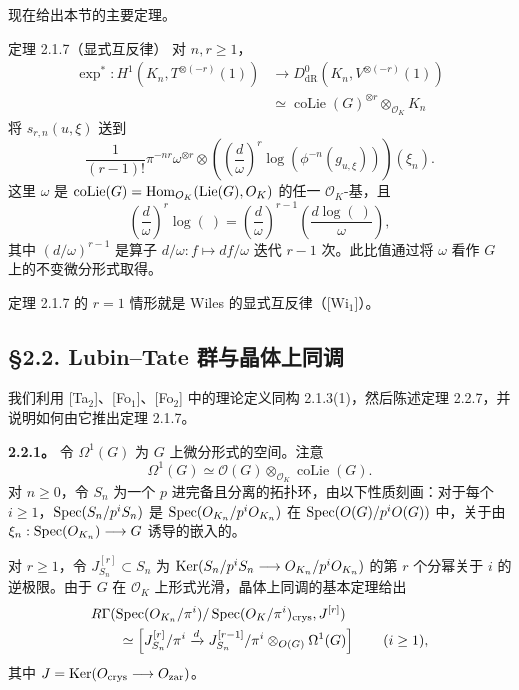 现在给出本节的主要定理。
\begin{statement}{定理 2.1.7（显式互反律）}
对 $n,r\ge1$，
\begin{align*}
 \exp^*:H^1(K_n,T^{\otimes(-r)}(1))
 &\longrightarrow D^0_{\mathrm{dR}}(K_n,V^{\otimes(-r)}(1))\\
 &\simeq\operatorname{coLie}(G)^{\otimes r}\otimes_{\mathcal O_K}K_n
\end{align*}
将 $s_{r,n}(u,\xi)$ 送到
\[
 \frac{1}{(r-1)!}\pi^{-nr}\omega^{\otimes r}\otimes
 \left(\left(\frac d\omega\right)^r\log(\phi^{-n}(g_{u,\xi}))\right)(\xi_n).
\]
这里 $\omega$ 是 $\operatorname{coLie}(G)=\operatorname{Hom}_{O_K}(\operatorname{Lie}(G),O_K)$ 的任一 $\mathcal O_K$-基，且
\[
 \left(\frac d\omega\right)^r\log(\ )=
 \left(\frac d\omega\right)^{r-1}\left(\frac{d\log(\ )}{\omega}\right),
\]
其中 $(d/\omega)^{r-1}$ 是算子 $d/\omega:f\mapsto df/\omega$ 迭代 $r-1$ 次。此比值通过将 $\omega$ 看作 $G$ 上的不变微分形式取得。
\end{statement}
定理 2.1.7 的 $r=1$ 情形就是 Wiles 的显式互反律（[Wi$_1$]）。

\subsection*{§2.2. Lubin--Tate 群与晶体上同调}
我们利用 [Ta$_2$]、[Fo$_1$]、[Fo$_2$] 中的理论定义同构 2.1.3(1)，然后陈述定理 2.2.7，并说明如何由它推出定理 2.1.7。

\textbf{2.2.1。} 令 $\Omega^1(G)$ 为 $G$ 上微分形式的空间。注意
\[
 \Omega^1(G)\simeq\mathcal O(G)\otimes_{\mathcal O_K}\operatorname{coLie}(G).
\]
对 $n\ge0$，令 $S_n$ 为一个 $p$ 进完备且分离的拓扑环，由以下性质刻画：对于每个 $i\ge1$，$\operatorname{Spec}(S_n/p^iS_n)$ 是
$\operatorname{Spec}(O_{K_n}/p^iO_{K_n})$ 在 $\operatorname{Spec}(O(G)/p^iO(G))$ 中，关于由 $\xi_n:\operatorname{Spec}(O_{K_n})\longrightarrow G$ 诱导的嵌入的。

对 $r\ge1$，令 $J^{[r]}_{S_n}\subset S_n$ 为 $\operatorname{Ker}(S_n/p^iS_n\longrightarrow O_{K_n}/p^iO_{K_n})$ 的第 $r$ 个分幂关于 $i$ 的逆极限。由于 $G$ 在 $\mathcal O_K$ 上形式光滑，晶体上同调的基本定理给出
\begin{align*}
 &R\Gamma(\operatorname{Spec}(O_{K_n}/\pi^i)/\operatorname{Spec}(O_K/\pi^i)_{\mathrm{crys}},J^{[r]})\\
 &\qquad\simeq\left[J^{[r]}_{S_n}/\pi^i\xrightarrow d
 J^{[r-1]}_{S_n}/\pi^i\otimes_{O(G)}\Omega^1(G)\right]\qquad(i\ge1),
\end{align*}
其中 $J=\operatorname{Ker}(O_{\mathrm{crys}}\longrightarrow O_{\mathrm{zar}})$。

